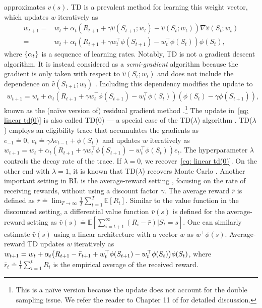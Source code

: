 \documentclass{article}
\newcommand{\E}{\mathbb{E}}
\begin{document}
approximates $v(s)$.
TD is a prevalent method for learning this weight vector,
which updates $w$ iteratively as
\begin{align}
    w_{t+1} =& w_t + \alpha_t \left(R_{t+1} + \gamma \hat{v}\left(S_{t+1};w_t\right) - \hat{v}\left(S_{t};w_t\right)\right) \nabla \hat{v}\left(S_{t};w_t\right) \\
    =& w_t + \alpha_t \left(R_{t+1} + \gamma w_t^\top \phi(S_{t+1}) - w_t^\top \phi(S_t)\right) \phi(S_t), \label{eq: linear td(0)}
\end{align}
where $\qty{\alpha_t}$ is a sequence of learning rates.
Notably, TD is not a gradient descent algorithm.
It is instead considered as a \emph{semi-gradient} algorithm because the gradient is only taken with respect to $\hat{v}\left(S_{t};w_t\right)$ and does not include the dependence on $\hat{v}\left(S_{t+1};w_t\right)$ \citep{sutton2018reinforcement}.
Including this dependency modifies the update to
\begin{align}
    w_{t+1} = w_t + \alpha_t \left(R_{t+1} + \gamma w_t^\top \phi(S_{t+1}) - w_t^\top \phi(S_t)\right) \left(\phi(S_t)- \gamma\phi(S_{t+1}) \right), \label{eq: residual grad td(0)}
\end{align}
known as the (naïve version of) residual gradient method \citep{baird1995residual}.\footnote{This is a naïve version because the update does not account for the double sampling issue. We refer the reader to Chapter 11 of \citet{sutton2018reinforcement} for detailed discussion.}
The update in~\eqref{eq: linear td(0)} is also called TD(0) --- a special case of the TD($\lambda$) algorithm \citep{sutton1988learning}.
TD($\lambda$) employs an eligibility trace that accumulates the gradients as
    $e_{-1} \doteq 0, \ e_{t} \doteq \gamma\lambda e_{t-1} + \phi(S_t)$ and updates $w$ iteratively as
    $w_{t+1} = w_t + \alpha_t (R_{t+1} + \gamma w_t^\top \phi(S_{t+1}) - w_t^\top \phi(S_t)) e_t$.
The hyperparameter $\lambda$ controls the decay rate of the trace.
If $\lambda=0$, we recover~\eqref{eq: linear td(0)}.
On the other end with $\lambda = 1$,
it is known that TD($\lambda$) recovers Monte Carlo \citep{sutton1988learning}.
Another important setting in RL is the average-reward setting \citep{puterman2014markov,sutton2018reinforcement}, focusing on the rate of receiving rewards, without using a discount factor $\gamma$.
The average reward $\bar{r}$ is defined as $\bar{r} \doteq \lim_{T \to \infty} \frac{1}{T} \sum_{t=1}^T \E[R_t]$.
Similar to the value function in the discounted setting,
a differential value function $\bar v(s)$ is defined for the average-reward setting as $\bar v(s) \doteq \E\left[\sum_{i=t+1}^\infty (R_i - \bar{r}) | S_t = s\right]$.
One can similarly estimate $\bar v(s)$ using a linear architecture with a vector $w$ as $w^\top \phi(s)$.
Average-reward TD \citep{tsitsiklis1999average} updates $w$ iteratively as
    $w_{t+1} = w_t + \alpha_t \qty(R_{t+1} - \bar{r}_{t+1} + w_t^\top \phi(S_{t+1}) - w_t^\top \phi(S_t)) \phi(S_t)$,
where $\bar r_t \doteq \frac{1}{t}\sum_{i=1}^t R_i$ is the empirical average of the received reward.
\end{document}
